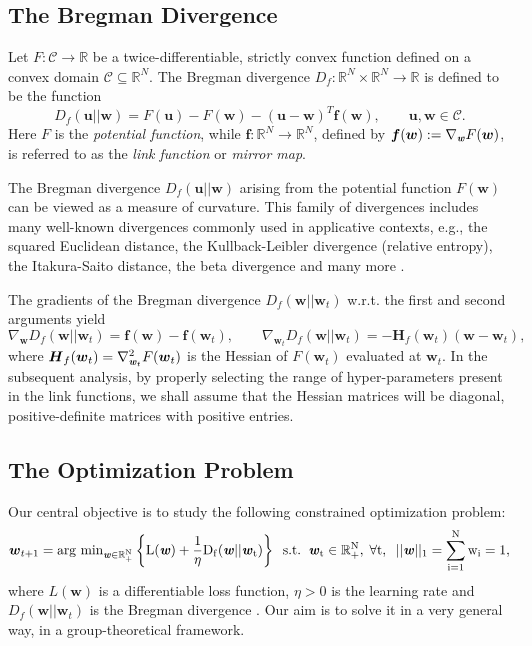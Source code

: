 \documentclass[10pt]{amsart}
\newcommand{\beq}{\begin{equation}}
\newcommand{\eeq}{\end{equation}}
\newcommand{\bos}{\boldsymbol}
\newcommand{\bi}[1]{\textbf{\textit{#1}}}
\newcommand{\bof}{\boldsymbol{f}}
\newcommand{\Rp}{\mathbb{R}^{N}_{+}}
\newcommand{\bH}{\boldsymbol{H}}
\newcommand{\bu}{\boldsymbol{u}}
\newcommand{\bw}{\boldsymbol{w}}
\theoremstyle{definition}
\theoremstyle{definition}	 %
\begin{document}
\subsection{The Bregman Divergence} Let $F: \mathcal{C}\to \mathbb{R}$ be a twice-differentiable, strictly convex function  defined on a convex domain $\mathcal{C}\subseteq \mathbb{R}^{N}$.  The Bregman divergence $D_f:\mathbb{R}^{N}\times \mathbb{R}^{N} \to \mathbb{R}$ is defined to be the function \cite{Bregman1967}
\beq
D_f(\bu || \bw) = F(\bu) - F(\bw) -  (\bu-\bw)^{T} \bof(\bw), \qquad \bu, \bw\in \mathcal{C}.
\label{Bregman1}
\eeq
Here $F$ is the \textit{potential function}, while $\bof: \mathbb{R}^{N}\to \mathbb{R}^{N}$, defined by $\bos{f}(\bw):= \nabla_{\bi w} F(\bw)$, is referred to as the \textit{link function} or \textit{mirror map}.
%

The Bregman divergence $D_f(\bu || \bw )$  arising from the potential function $F(\bw)$ can be viewed as a measure of curvature. This family of divergences includes many well-known divergences commonly used in applicative contexts, e.g., the squared Euclidean distance, the Kullback-Leibler divergence (relative entropy), the Itakura-Saito distance, the beta divergence and many more \cite{Cia3}.

The gradients of  the Bregman divergence $D_f(\bw || \bw_t)$  w.r.t. the first and second arguments  yield
\beq
\nabla_{\bw} D_f(\bw || \bw_t)= \bof(\bw) - \bof(\bw_t), \qquad \nabla_{\bw_t} D_f(\bw || \bw_t)= -  \bH_f(\bw_t) (\bw - \bw_t),
\label{Bregman2}
\eeq
where
$
\bH_f(\bw_t) =\nabla^2_{\bi w_t} F(\bw_t)$ %
 is the Hessian of $F(\bw_t)$ evaluated at $\bw_t$.  In the subsequent analysis,  by properly selecting the range of hyper-parameters present in the link functions, we shall assume that the Hessian matrices will be diagonal, positive-definite  matrices with  positive entries.

\subsection{The Optimization Problem}
Our central objective is to study the following constrained optimization problem:
\beq
	\bw_{t+1} = \rm{arg}~\rm{min}_{\bi w \in \Rp } \left\{ L(\bi{w} )+ \frac{1}{\eta} D_f(\bi{w} || \bi{w}_t)  \right\} \;\; \text{s.t.} \;\; \bi{w}_t\in \Rp,\; \forall t , \;\; ||\bi{w}||_1=\sum_{i=1}^{N} w_{i}=1,
	\label{Eq-1a}
\eeq
where  $L(\bw)$ is a differentiable loss function,  $\eta > 0$ is the learning rate and
$D_f(\bw || \bw_t)$ is the Bregman divergence \cite{Bregman1967}. Our aim is to solve it in a very general way, in a group-theoretical framework.
\end{document}
